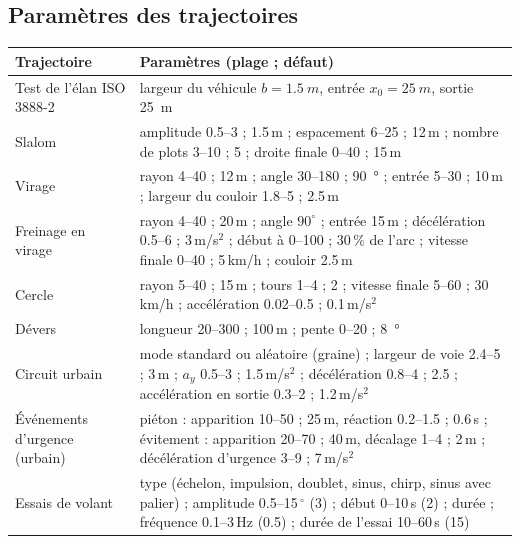 \documentclass[11pt,a4paper]{article}
\begin{document}
\subsection{Paramètres des trajectoires}
\begin{center}\small
\begin{tabular}{@{}p{5.2cm}p{7.3cm}@{}}\toprule
Trajectoire & Paramètres (plage ; défaut)\\\midrule
Test de l'élan ISO 3888-2 & largeur du véhicule $b=\SI{1,5}{m}$, entrée $x_0=\SI{25}{m}$, sortie \SI{25}{m}\\
Slalom & amplitude \numrange{0,5}{3} ; \num{1,5}\,m ; espacement \numrange{6}{25} ; \num{12}\,m ; nombre de plots \numrange{3}{10} ; \num{5} ; droite finale \numrange{0}{40} ; \num{15}\,m\\
Virage & rayon \numrange{4}{40} ; \num{12}\,m ; angle \numrange{30}{180} ; \SI{90}{\degree} ; entrée \numrange{5}{30} ; \num{10}\,m ; largeur du couloir \numrange{1,8}{5} ; \num{2,5}\,m\\
Freinage en virage & rayon \numrange{4}{40} ; \num{20}\,m ; angle $90^\circ$ ; entrée \num{15}\,m ; décélération \numrange{0,5}{6} ; \num{3}\,m/s$^2$ ; début à \numrange{0}{100} ; \num{30}\,\% de l'arc ; vitesse finale \numrange{0}{40} ; \num{5}\,km/h ; couloir \num{2,5}\,m\\
Cercle & rayon \numrange{5}{40} ; \num{15}\,m ; tours \numrange{1}{4} ; \num{2} ; vitesse finale \numrange{5}{60} ; \num{30}\,km/h ; accélération \numrange{0,02}{0,5} ; \num{0,1}\,m/s$^2$\\
Dévers & longueur \numrange{20}{300} ; \num{100}\,m ; pente \numrange{0}{20} ; \SI{8}{\degree}\\
Circuit urbain & mode standard ou aléatoire (graine) ; largeur de voie \numrange{2,4}{5} ; \num{3}\,m ; $a_y$ \numrange{0,5}{3} ; \num{1,5}\,m/s$^2$ ; décélération \numrange{0,8}{4} ; \num{2,5} ; accélération en sortie \numrange{0,3}{2} ; \num{1,2}\,m/s$^2$\\
Événements d'urgence (urbain) & piéton : apparition \numrange{10}{50} ; \num{25}\,m, réaction \numrange{0,2}{1,5} ; \num{0,6}\,s ; évitement : apparition \numrange{20}{70} ; \num{40}\,m, décalage \numrange{1}{4} ; \num{2}\,m ; décélération d'urgence \numrange{3}{9} ; \num{7}\,m/s$^2$\\
Essais de volant & type (échelon, impulsion, doublet, sinus, chirp, sinus avec palier) ; amplitude \numrange{0,5}{15}\,$^\circ$ (\num{3}) ; début \numrange{0}{10}\,s (\num{2}) ; durée ; fréquence \numrange{0,1}{3}\,Hz (\num{0,5}) ; durée de l'essai \numrange{10}{60}\,s (\num{15})\\\bottomrule
\end{tabular}
\end{center}
\end{document}
